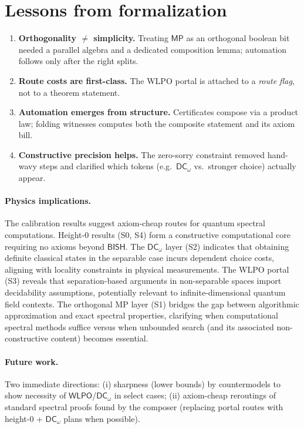 \documentclass[11pt]{article}
\newcommand{\WLPO}{\mathsf{WLPO}}
\newcommand{\DCw}{\mathsf{DC}_{\omega}}
\newcommand{\MP}{\mathsf{MP}}
\theoremstyle{plain}
\theoremstyle{definition}
\theoremstyle{remark}
\newcommand{\BISH}{\mathsf{BISH}}
\begin{document}
\section{Lessons from formalization}\label{sec:lessons}
\begin{enumerate}
  \item \textbf{Orthogonality \(\neq\) simplicity.}
  Treating \(\MP\) as an orthogonal boolean bit needed a parallel algebra and a
  dedicated composition lemma; automation follows only after the right splits.
  \item \textbf{Route costs are first-class.}
  The WLPO portal is attached to a \emph{route flag}, not to a theorem statement.
  \item \textbf{Automation emerges from structure.}
  Certificates compose via a product law; folding witnesses computes both the
  composite statement and its axiom bill.
  \item \textbf{Constructive precision helps.}
  The zero-sorry constraint removed hand-wavy steps and clarified which tokens
  (e.g.\ \(\DCw\) vs.\ stronger choice) actually appear.
\end{enumerate}

\paragraph{Physics implications.}
The calibration results suggest axiom-cheap routes for quantum spectral computations. Height-0 results (S0, S4) form a constructive computational core requiring no axioms beyond $\BISH$. The $\DCw$ layer (S2) indicates that obtaining definite classical states in the separable case incurs dependent choice costs, aligning with locality constraints in physical measurements. The WLPO portal (S3) reveals that separation-based arguments in non-separable spaces import decidability assumptions, potentially relevant to infinite-dimensional quantum field contexts. The orthogonal MP layer (S1) bridges the gap between algorithmic approximation and exact spectral properties, clarifying when computational spectral methods suffice versus when unbounded search (and its associated non-constructive content) becomes essential.

\paragraph{Future work.}
Two immediate directions: (i) sharpness (lower bounds) by countermodels to show
necessity of \(\WLPO\)/\(\DCw\) in select cases; (ii) axiom-cheap reroutings of
standard spectral proofs found by the composer (replacing portal routes with
height-0 + \(\DCw\) plans when possible).
\end{document}
